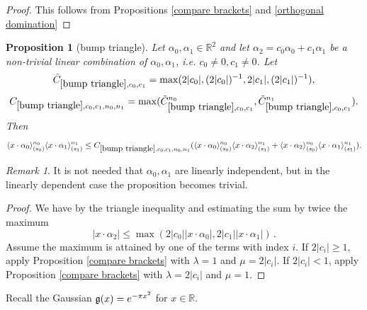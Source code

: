\documentclass[12pt,reqno]{amsart}
\theoremstyle{plain}
\newtheorem{proposition}[theorem]{Proposition}
\numberwithin{equation}{section}
\theoremstyle{remark}
\newtheorem{rem}{Remark}[section]
\newcommand{\using}[1]{}
\newcommand{\R}{{\mathbb R}}
\begin{document}
\begin{proof}
This follows from Propositions \ref{compare brackets} and \ref{orthogonal domination}
\end{proof}

\begin{proposition}[bump triangle]\label{bump triangle}\using{compare brackets}
Let $\alpha_0,\alpha_1\in\mathbb{R}^2$ and let $\alpha_2=c_0\alpha_0+c_1\alpha_1$ be a non-trivial linear combination of $\alpha_0,\alpha_1$, i.e. $c_0\not=0, c_1\not=0$.
Let
\begin{equation}\label{auto:bump-triangle-scale-constant}\tilde{C}_{\ref{bump triangle},c_0,c_1}=\max(2|c_0|, (2|c_0|)^{-1},2|c_1|, (2|c_1|)^{-1}),\end{equation}
\begin{equation}\label{auto:bump-triangle-constant}
    C_{\ref{bump triangle},c_0,c_1,n_0,n_1}=\max(\tilde{C}_{\ref{bump triangle},c_0,c_1}^{n_0}, \tilde{C}_{\ref{bump triangle},c_0,c_1}^{n_1}).
\end{equation}
Then
\begin{equation}\label{auto:bump-triangle-bound} \langle x\cdot \alpha_0\rangle_{(s_0)}^{n_0} \langle x\cdot \alpha_1\rangle_{(s_1)}^{n_1}
\le C_{\ref{bump triangle},c_0,c_1,n_0,n_1}(\langle x\cdot \alpha_0\rangle_{(s_0)}^{n_0}\langle x\cdot \alpha_2\rangle_{(s_1)}^{n_1} + \langle x\cdot \alpha_2\rangle_{(s_0)}^{n_0}\langle x\cdot \alpha_1\rangle_{(s_1)}^{n_1}).
\end{equation}
\end{proposition}
\begin{rem}
It is not needed that $\alpha_0,\alpha_1$ are linearly independent, but in the linearly dependent case the proposition becomes trivial.
\end{rem}
\begin{proof}
We have by the triangle inequality and estimating the sum by twice the maximum
\begin{equation}
    |x\cdot \alpha_2|\le \max(2|c_0||x\cdot \alpha_0|,2|c_1||x\cdot \alpha_1|)\, .
\end{equation}
Assume the maximum is attained by one of the terms with index $i$.
If $2|c_i|\ge 1$, apply Proposition \ref{compare brackets} with $\lambda=1$ and $\mu=2|c_i|$.
If $2|c_i|< 1$, apply Proposition \ref{compare brackets} with $\lambda=2|c_i|$ and $\mu=1$.
\end{proof}


Recall the Gaussian $\mathfrak{g}(x)=e^{-\pi x^2}$ for $x\in\R$.
\end{document}
